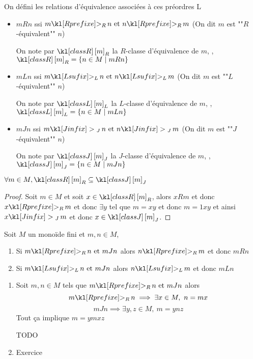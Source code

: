 \begin{notation}
	On défini les relations d'équivalence associées à ces préordres L
	\begin{itemize}
		\item $m R n$ ssi $m \geqr n \et n \geqr m$ (On dit $m$ est ""$R$-équivalent""  $n$)

		      On note par $\classr m$ la $R$-classe d'équivalence de $m$, \ie, $\classr m =
			      \setdef {n \in M} {m R n}$

		\item $m L n$ ssi $m \geql n \et n \geql m$ (On dit $m$ est ""$L$-équivalent""  $n$)

		      On note par $\classl m$ la $L$-classe d'équivalence de $m$, \ie, $\classl m =
			      \setdef {n \in M} {m L n}$

		\item $m J n$ ssi $m \geqj n \et n \geqj m$ (On dit $m$ est ""$J$-équivalent""  $n$)

		      On note par $\classj m$ la $J$-classe d'équivalence de $m$, \ie, $\classj m =
			      \setdef {n \in M} {m J n}$
	\end{itemize}
\end{notation}

\begin{exercice}
	$\forall m \in M, \classr m \subseteq \classj m$
\end{exercice}

\begin{proof}
	Soit $m \in M$ et soit $x \in \classr m$, alors $x R m$ et donc
	$ x \geqr m$ et donc $\exists y $ tel que $m = xy$ et donc $m = 1xy$ et ainsi
	$x \geqj m$ et donc $x \in \classj m$.
\end{proof}

\begin{lemma}
	Soit $M$ un monoïde fini et $m,n \in M$,

	\begin{enumerate}
		\item Si $m \geqr n \et m J n$ alors $n \geqr m$ et donc $m R n$
		\item Si $m \geql n \et m J n$ alors $n \geql m$ et donc $m L n$
	\end{enumerate}
\end{lemma}

\begin{proofI}
	\begin{enumerate}
		\item Soit $m,n \in M$ tels que $m \geqr n \et m J n$ alors
		      $$m \geqr n  \implies \exists x \in M, \ n = mx$$
		      $$m J n  \implies \exists y,z \in M, \ m = ynz$$
		      Tout ça implique $m = ymxz$

		      TODO

		\item Exercice
	\end{enumerate}
\end{proofI}


